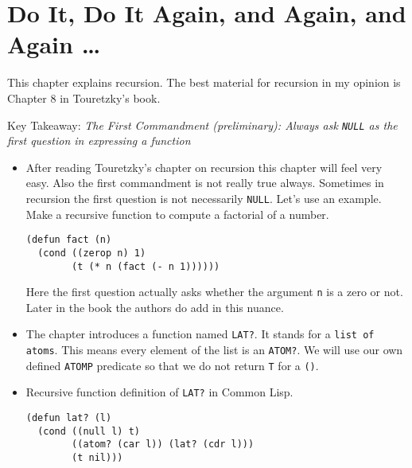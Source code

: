 \documentclass[11pt]{article}
\begin{document}
\newpage
\section{Do It, Do It Again, and Again, and Again \ldots{}}
\label{sec:org933a314}

This chapter explains recursion. The best material for recursion in my opinion is Chapter 8 in Touretzky's book.

\vspace{1em}

Key Takeaway:
\emph{The First Commandment (preliminary): Always ask \texttt{NULL} as the first question in expressing a function}

\vspace{1em}
\begin{itemize}
\item After reading Touretzky's chapter on recursion this chapter will feel very easy. Also the first commandment is not
really true always. Sometimes in recursion the first question is not necessarily \texttt{NULL}. Let's use an example. Make
a recursive  function to compute a factorial of a number.
\begin{verbatim}
(defun fact (n)
  (cond ((zerop n) 1)
        (t (* n (fact (- n 1))))))

\end{verbatim}
Here the first question actually asks whether the argument \texttt{n} is a zero or not. Later in the book the authors do
add in this nuance.
\item The chapter introduces a function named \texttt{LAT?}. It stands for a \texttt{list of atoms}. This means every element of the
list is an \texttt{ATOM?}. We will use our own defined \texttt{ATOMP} predicate so that we do not return \texttt{T} for a \texttt{()}.
\item Recursive function definition of \texttt{LAT?} in Common Lisp.
\begin{verbatim}
(defun lat? (l)
  (cond ((null l) t)
        ((atom? (car l)) (lat? (cdr l)))
        (t nil)))


\end{verbatim}
\end{itemize}
\end{document}
